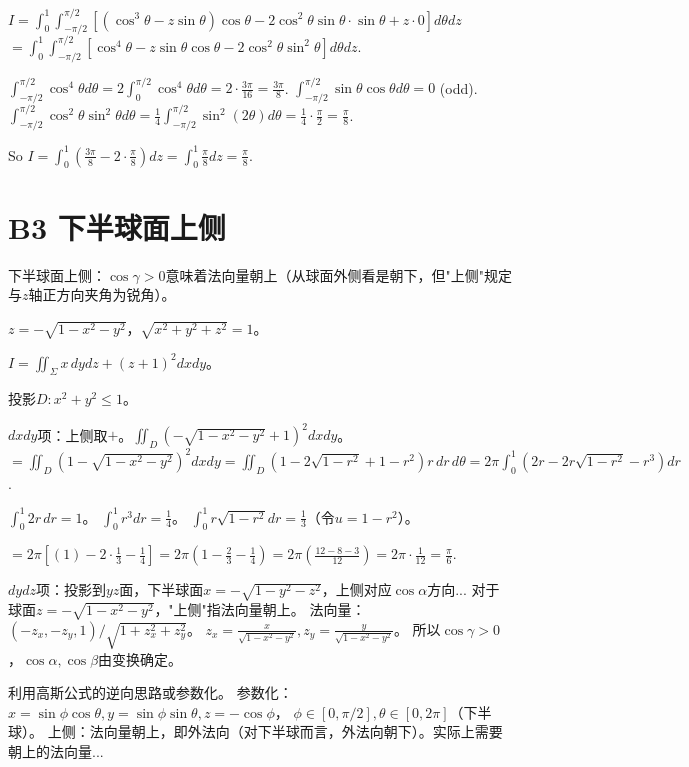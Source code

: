 \documentclass[12pt,a4paper]{ctexart}
\newcommand{\answerbox}[1]{\begin{center}\fbox{\color{red}\large\bfseries #1}\end{center}}
\begin{document}
$I = \int_0^1\int_{-\pi/2}^{\pi/2}[(\cos^3\theta - z\sin\theta)\cos\theta - 2\cos^2\theta\sin\theta\cdot\sin\theta + z\cdot0]d\theta dz$
$= \int_0^1\int_{-\pi/2}^{\pi/2}[\cos^4\theta - z\sin\theta\cos\theta - 2\cos^2\theta\sin^2\theta]d\theta dz$.

$\int_{-\pi/2}^{\pi/2}\cos^4\theta d\theta = 2\int_0^{\pi/2}\cos^4\theta d\theta = 2\cdot\frac{3\pi}{16} = \frac{3\pi}{8}$.
$\int_{-\pi/2}^{\pi/2}\sin\theta\cos\theta d\theta = 0$ (odd).
$\int_{-\pi/2}^{\pi/2}\cos^2\theta\sin^2\theta d\theta = \frac14\int_{-\pi/2}^{\pi/2}\sin^2(2\theta)d\theta = \frac14\cdot\frac\pi2 = \frac\pi8$.

So $I = \int_0^1(\frac{3\pi}{8} - 2\cdot\frac\pi8)dz = \int_0^1\frac\pi8 dz = \frac\pi8$.
\answerbox{$\frac\pi8$}

\section{B3 下半球面上侧}


下半球面上侧：$\cos\gamma>0$意味着法向量朝上（从球面外侧看是朝下，但"上侧"规定与$z$轴正方向夹角为锐角）。

$z=-\sqrt{1-x^2-y^2}$，$\sqrt{x^2+y^2+z^2}=1$。

$I = \iint_\Sigma x\,dydz + (z+1)^2dxdy$。

投影$D:x^2+y^2\le1$。

$dxdy$项：上侧取$+$。$\iint_D(-\sqrt{1-x^2-y^2}+1)^2dxdy$。
$=\iint_D(1-\sqrt{1-x^2-y^2})^2dxdy
  =\iint_D(1-2\sqrt{1-r^2}+1-r^2)r\,dr\,d\theta
  =2\pi\int_0^1(2r-2r\sqrt{1-r^2}-r^3)dr$.

$\int_0^1 2r\,dr = 1$。
$\int_0^1 r^3 dr = \frac14$。
$\int_0^1 r\sqrt{1-r^2}dr = \frac13$（令$u=1-r^2$）。

$=2\pi[(1) - 2\cdot\frac13 - \frac14] = 2\pi(1-\frac23-\frac14) = 2\pi(\frac{12-8-3}{12}) = 2\pi\cdot\frac1{12} = \frac\pi6$.

$dydz$项：投影到$yz$面，下半球面$x=-\sqrt{1-y^2-z^2}$，上侧对应$\cos\alpha$方向...
对于球面$z=-\sqrt{1-x^2-y^2}$，"上侧"指法向量朝上。
法向量：$(-z_x,-z_y,1)/\sqrt{1+z_x^2+z_y^2}$。
$z_x = \frac{x}{\sqrt{1-x^2-y^2}}, z_y = \frac{y}{\sqrt{1-x^2-y^2}}$。
所以$\cos\gamma>0$，$\cos\alpha,\cos\beta$由变换确定。

利用高斯公式的逆向思路或参数化。
参数化：$x=\sin\phi\cos\theta,y=\sin\phi\sin\theta,z=-\cos\phi$，
$\phi\in[0,\pi/2],\theta\in[0,2\pi]$（下半球）。
上侧：法向量朝上，即外法向（对下半球而言，外法向朝下）。实际上需要朝上的法向量...
\end{document}
